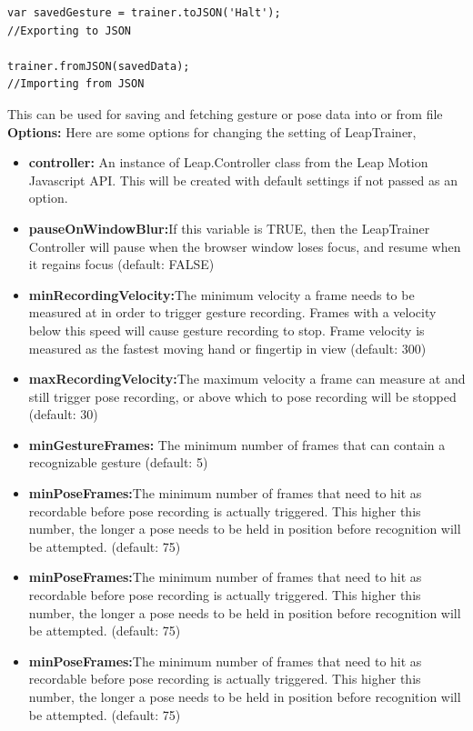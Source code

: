 \documentclass[11pt,a4paper]{article}
\newcommand\tab[1][1cm]{\hspace*{#1}}
\begin{document}
\tab{This framework exports data in the form of JSON and also accepts imports in the form of JSON.}
\begin{lstlisting}
var savedGesture = trainer.toJSON('Halt'); 
//Exporting to JSON

trainer.fromJSON(savedData);
//Importing from JSON
\end{lstlisting}
This can be used for saving and fetching gesture or pose data into or from file
\vspace{2cm}
\textbf{Options:}
Here are some options for changing the setting of LeapTrainer,
\begin{itemize}
    \item \textbf{controller:} An instance of Leap.Controller class from the Leap Motion Javascript API. This will be created with default settings if not passed as an option.
    \item \textbf{pauseOnWindowBlur:}If this variable is TRUE, then the LeapTrainer Controller will pause when the browser window loses focus, and resume when it regains focus (default: FALSE)
    \item \textbf{minRecordingVelocity:}The minimum velocity a frame needs to be measured at in order to trigger gesture recording. Frames with a velocity below this speed will cause gesture recording to stop. Frame velocity is measured as the fastest moving hand or fingertip in view (default: 300)
    \item \textbf{maxRecordingVelocity:}The maximum velocity a frame can measure at and still trigger pose recording, or above which to pose recording will be stopped (default: 30)
    \item \textbf{minGestureFrames:} The minimum number of frames that can contain a recognizable gesture (default: 5)
    \item \textbf{minPoseFrames:}The minimum number of frames that need to hit as recordable before pose recording is actually triggered. This higher this number, the longer a pose needs to be held in position before recognition will be attempted. (default: 75)
    \item \textbf{minPoseFrames:}The minimum number of frames that need to hit as recordable before pose recording is actually triggered. This higher this number, the longer a pose needs to be held in position before recognition will be attempted. (default: 75)
    \item \textbf{minPoseFrames:}The minimum number of frames that need to hit as recordable before pose recording is actually triggered. This higher this number, the longer a pose needs to be held in position before recognition will be attempted. (default: 75)

\end{itemize}
\end{document}
